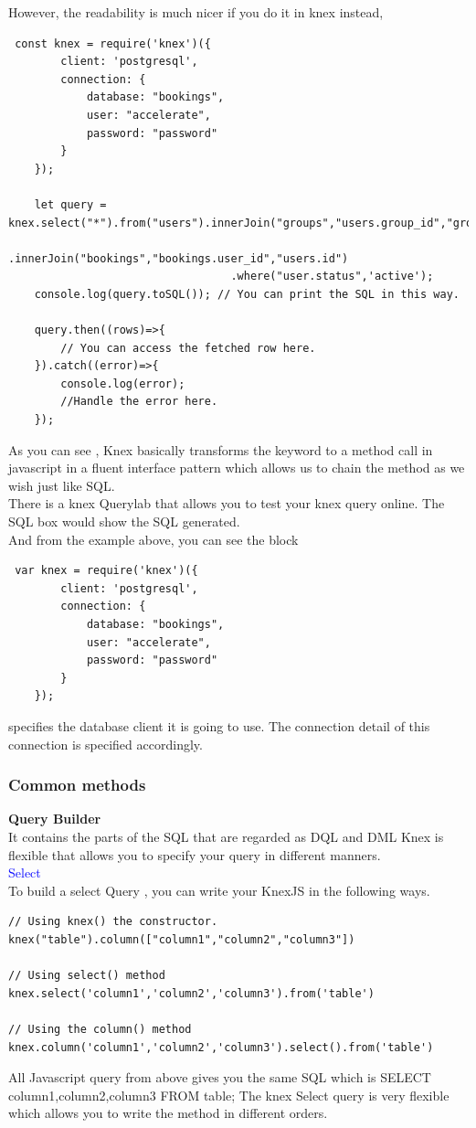 \documentclass[a4paper]{article}
\begin{document}
However, the readability is much nicer if you do it in knex instead,
\begin{lstlisting}
 const knex = require('knex')({
        client: 'postgresql',
        connection: {
            database: "bookings",
            user: "accelerate",
            password: "password"
        }
    });

    let query = knex.select("*").from("users").innerJoin("groups","users.group_id","groups.id")
                                  .innerJoin("bookings","bookings.user_id","users.id")
                                  .where("user.status",'active');
    console.log(query.toSQL()); // You can print the SQL in this way.

    query.then((rows)=>{
        // You can access the fetched row here.
    }).catch((error)=>{
        console.log(error);
        //Handle the error here.
    });
\end{lstlisting}
As you can see , Knex basically transforms the keyword to a method call in javascript in a fluent interface pattern which allows us to chain the method as we wish just like SQL.\\

There is a knex Querylab that allows you to test your knex query online. The SQL box would show the SQL generated.\\

And from the example above, you can see the block\\
\begin{lstlisting}
 var knex = require('knex')({
        client: 'postgresql',
        connection: {
            database: "bookings",
            user: "accelerate",
            password: "password"
        }
    });
\end{lstlisting}
specifies the database client it is going to use. The connection detail of this connection is specified accordingly.
\subsubsection{Common methods}
\textbf{Query Builder}\\
It contains the parts of the SQL that are regarded as DQL and DML Knex is flexible that allows you to specify your query in different manners.\\

\textcolor{blue}{Select}\\
To build a select Query , you can write your KnexJS in the following ways.
\begin{lstlisting}
// Using knex() the constructor.
knex("table").column(["column1","column2","column3"])

// Using select() method
knex.select('column1','column2','column3').from('table')

// Using the column() method
knex.column('column1','column2','column3').select().from('table')
\end{lstlisting}
All Javascript query from above gives you the same SQL which is SELECT column1,column2,column3 FROM table; The knex Select query is very flexible which allows you to write the method in different orders.
\end{document}
